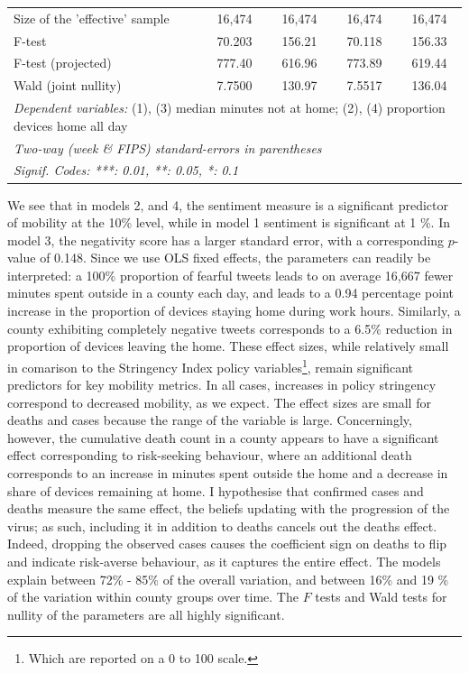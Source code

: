 \documentclass{article}
\begin{document}
\begin{singlespace}
\begin{table}[!htb]
\begin{tabular}{lcccc}
  Size of the 'effective' sample & 16,474&16,474&16,474&16,474\\
  F-test & 70.203&156.21&70.118&156.33\\
  F-test (projected) & 777.40&616.96&773.89&619.44\\
Wald (joint nullity) & 7.7500&130.97&7.5517&136.04\\
  \midrule\midrule\multicolumn{5}{l}{\emph{Dependent variables:} (1), (3) median minutes not at home; (2), (4) proportion devices home all day}\\
  \multicolumn{5}{l}{\emph{Two-way (week \& FIPS) standard-errors in parentheses}}\\
  \multicolumn{5}{l}{\emph{Signif. Codes: ***: 0.01, **: 0.05, *: 0.1}}\\
  \end{tabular}
\end{table}
\end{singlespace}
We see that in models 2, and 4, the sentiment measure is a significant predictor of mobility at the 10\% level, while in model 1 sentiment is significant at 1 \%. In model 3, the negativity score has a larger standard error, with a corresponding \(p\)-value of 0.148. Since we use OLS fixed effects, the parameters can readily be interpreted: a 100\% proportion of fearful tweets leads to on average 16,667 fewer minutes spent outside in a county each day, and leads to a 0.94 percentage point increase in the proportion of devices staying home during work hours. Similarly, a county exhibiting completely negative tweets corresponds to a 6.5\% reduction in proportion of devices leaving the home. These effect sizes, while relatively small in comarison to the Stringency Index policy variables\footnote{Which are reported on a 0 to 100 scale.}, remain significant predictors for key mobility metrics. In all cases, increases in policy stringency correspond to decreased mobility, as we expect. The effect sizes are small for deaths and cases because the range of the variable is large. Concerningly, however, the cumulative death count in a county appears to have a significant effect corresponding to risk-seeking behaviour, where an additional death corresponds to an increase in minutes spent outside the home and a decrease in share of devices remaining at home. I hypothesise that confirmed cases and deaths measure the same effect, the beliefs updating with the progression of the virus; as such, including it in addition to deaths cancels out the deaths effect. Indeed, dropping the observed cases causes the coefficient sign on deaths to flip and indicate risk-averse behaviour, as it captures the entire effect. The models explain between 72\% - 85\% of the overall variation, and between 16\% and 19 \% of the variation within county groups over time. The \(F\) tests and Wald tests for nullity of the parameters are all highly significant.
\end{document}
